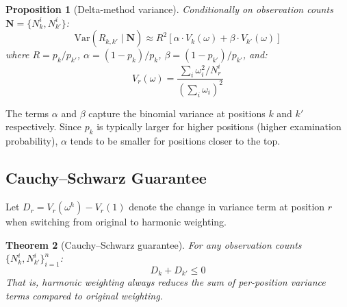 \documentclass[sigconf]{acmart}
\newtheorem{theorem}{Theorem}
\newtheorem{proposition}[theorem]{Proposition}
\begin{document}
\begin{proposition}[Delta-method variance]
\label{prop:delta_method}
Conditionally on observation counts $\mathbf{N} = \{N_k^i, N_{k'}^i\}$:
\begin{equation}
\mathrm{Var}(\hat{R}_{k,k'} \mid \mathbf{N}) \approx R^2 \left[\alpha \cdot V_k(\omega) + \beta \cdot V_{k'}(\omega)\right]
\end{equation}
where $R = p_k/p_{k'}$, $\alpha = (1-p_k)/p_k$, $\beta = (1-p_{k'})/p_{k'}$, and:
\begin{equation}
V_r(\omega) = \frac{\sum_i \omega_i^2 / N_r^i}{\left(\sum_i \omega_i\right)^2}
\end{equation}
\end{proposition}

The terms $\alpha$ and $\beta$ capture the binomial variance at positions $k$ and $k'$ respectively. Since $p_k$ is typically larger for higher positions (higher examination probability), $\alpha$ tends to be smaller for positions closer to the top.

\subsection{Cauchy–Schwarz Guarantee}

Let $D_r = V_r(\omega^h) - V_r(1)$ denote the change in variance term at position $r$ when switching from original to harmonic weighting.

\begin{theorem}[Cauchy–Schwarz guarantee]
\label{thm:cs}
For any observation counts $\{N_k^i, N_{k'}^i\}_{i=1}^n$:
\[
D_k + D_{k'} \leq 0
\]
That is, harmonic weighting always reduces the sum of per-position variance terms compared to original weighting.
\end{theorem}
\end{document}
